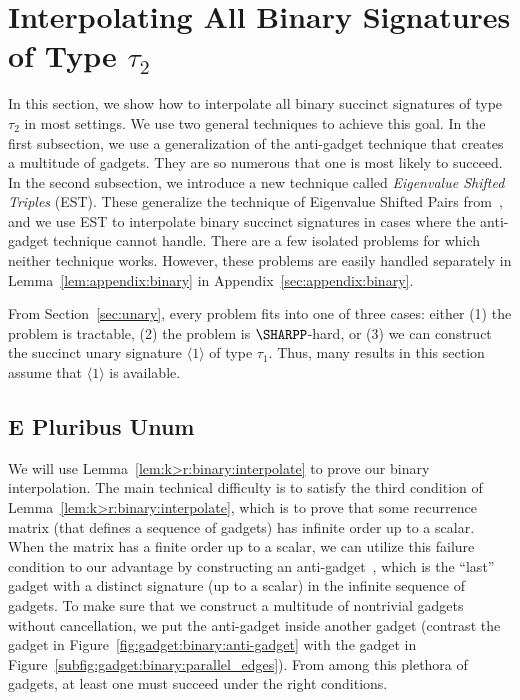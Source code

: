 \documentclass[11pt]{article}
\begin{document}
\section{Interpolating All Binary Signatures of Type \texorpdfstring{$\tau_2$}{tau-2}} \label{sec:binary}

In this section,
we show how to interpolate all binary succinct signatures of type $\tau_2$ in most settings.
We use two general techniques to achieve this goal.
In the first subsection,
we use a generalization of the anti-gadget technique that creates a multitude of gadgets.
They are so numerous that one is most likely to succeed.
In the second subsection,
we introduce a new technique called \emph{Eigenvalue Shifted Triples} (EST).
These generalize the technique of Eigenvalue Shifted Pairs from~\cite{KC10},
and we use EST to interpolate binary succinct signatures in cases where the anti-gadget technique cannot handle.
There are a few isolated problems for which neither technique works.
However, these problems are easily handled separately in Lemma~\ref{lem:appendix:binary} in Appendix~\ref{sec:appendix:binary}.

From Section~\ref{sec:unary},
every problem fits into one of three cases: either
(1) the problem is tractable,
(2) the problem is $\SHARPP$-hard, or
(3) we can construct the succinct unary signature $\langle 1 \rangle$ of type $\tau_1$.
Thus, many results in this section assume that $\langle 1 \rangle$ is available.

\subsection{E Pluribus Unum}

We will use Lemma~\ref{lem:k>r:binary:interpolate} to prove our binary interpolation.
The main technical difficulty is to satisfy the third condition of Lemma~\ref{lem:k>r:binary:interpolate},
which is to prove that some recurrence matrix (that defines a sequence of gadgets) has infinite order up to a scalar.
When the matrix has a finite order up to a scalar,
we can utilize this failure condition to our advantage by constructing an anti-gadget~\cite{CKW12},
which is the “last” gadget with a distinct signature (up to a scalar) in the infinite sequence of gadgets.
To make sure that we construct a multitude of nontrivial gadgets without cancellation,
we put the anti-gadget inside another gadget
(contrast the gadget in Figure~\ref{fig:gadget:binary:anti-gadget} with the gadget in Figure~\ref{subfig:gadget:binary:parallel_edges}).
From among this plethora of gadgets,
at least one must succeed under the right conditions.
\end{document}
